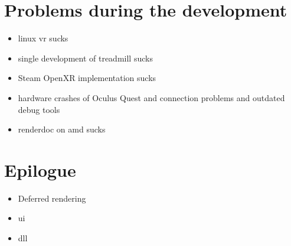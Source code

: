 \label{sec:problems}
\section{Problems during the development}
\begin{itemize}
    \item linux vr sucks
    \item single development of treadmill sucks
    \item Steam OpenXR implementation sucks
    \item hardware crashes of Oculus Quest and connection problems and outdated debug tools
    \item renderdoc on amd sucks
\end{itemize}
\section{Epilogue}
\begin{itemize}
    \item Deferred rendering
    \item ui
    \item dll
\end{itemize}